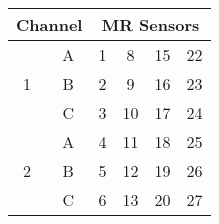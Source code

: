 \begin{tabular}{cccccc}
\toprule
\multicolumn{2}{c}{Channel} & \multicolumn{4}{c}{MR Sensors} \\
\midrule
\multirow{3}{*}{1}    & A   & 1     & 8      & 15    & 22    \\
                      & B   & 2     & 9      & 16    & 23    \\
                      & C   & 3     & 10     & 17    & 24    \\
\midrule
\multirow{3}{*}{2}    & A   & 4     & 11     & 18    & 25    \\
                      & B   & 5     & 12     & 19    & 26    \\
                      & C   & 6     & 13     & 20    & 27    \\
\bottomrule
\end{tabular}